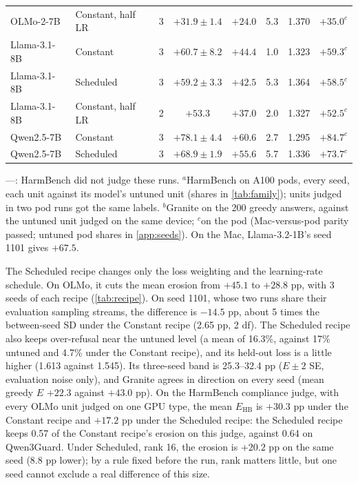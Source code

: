 \documentclass{article}
\newcommand{\Ehb}{E_{\mathrm{HB}}}
\begin{document}
\begin{table}[t]
\begin{tabular}{@{}l l c c C{2.2cm} c c C{2.3cm}@{}}
    OLMo-2-7B & Constant, half LR & 3 & $\mathbf{+31.9} \pm 1.4$ & $+24.0$ & 5.3 & 1.370 & $+35.0^{c}$ \\
    Llama-3.1-8B & Constant & 3 & $+60.7 \pm 8.2$ & $+44.4$ & 1.0 & 1.323 & $+59.3^{c}$ \\
    Llama-3.1-8B & Scheduled & 3 & $+59.2 \pm 3.3$ & $+42.5$ & 5.3 & 1.364 & $+58.5^{c}$ \\
    Llama-3.1-8B & Constant, half LR & 2 & $+53.3$ & $+37.0$ & 2.0 & 1.327 & $+52.5^{c}$ \\
    Qwen2.5-7B & Constant & 3 & $+78.1 \pm 4.4$ & $+60.6$ & 2.7 & 1.295 & $+84.7^{c}$ \\
    Qwen2.5-7B & Scheduled & 3 & $\mathbf{+68.9} \pm 1.9$ & $+55.6$ & 5.7 & 1.336 & $+73.7^{c}$ \\
    \bottomrule
  \end{tabular}

  \smallskip
  \parbox{\textwidth}{\footnotesize\raggedright
    ---: HarmBench did not judge these runs.
    $^{a}$HarmBench on A100 pods, every seed, each unit against its model's
    untuned unit (shares in \cref{tab:family}); units judged in two pod runs
    got the same labels.
    $^{b}$Granite on the 200 greedy answers, against the untuned unit judged on
    the same device; $^{c}$on the pod (Mac-versus-pod parity passed; untuned
    pod shares in \cref{app:seeds}). On the Mac, Llama-3.2-1B's seed 1101
    gives $+67.5$.}
\end{table}

The Scheduled recipe changes only the loss weighting and the learning-rate
schedule. On OLMo, it cuts the mean erosion from $+45.1$ to $+28.8$ pp, with 3
seeds of each recipe (\cref{tab:recipe}). On seed 1101, whose two runs share
their evaluation sampling streams, the difference is $-14.5$ pp, about 5 times
the between-seed SD under the Constant recipe (2.65 pp, 2 df). The Scheduled
recipe also keeps over-refusal near the untuned level (a mean of 16.3\%, against
17\% untuned and 4.7\% under the Constant recipe), and its held-out loss is a
little higher (1.613 against 1.545).
Its three-seed band is 25.3--32.4 pp ($E \pm 2$ SE, evaluation noise only), and
Granite agrees in direction on every seed (mean greedy $E$ $+22.3$ against
$+43.0$ pp). On the HarmBench compliance judge, with every OLMo unit judged on
one GPU type, the mean $\Ehb$ is $+30.3$ pp under the Constant recipe and
$+17.2$ pp under the Scheduled recipe: the Scheduled recipe keeps 0.57 of the
Constant recipe's erosion on this judge, against 0.64 on Qwen3Guard. Under
Scheduled, rank 16, the erosion is $+20.2$ pp on the same seed (8.8 pp lower);
by a rule fixed before the run, rank matters little, but one seed cannot
exclude a real difference of this size.
\end{document}
